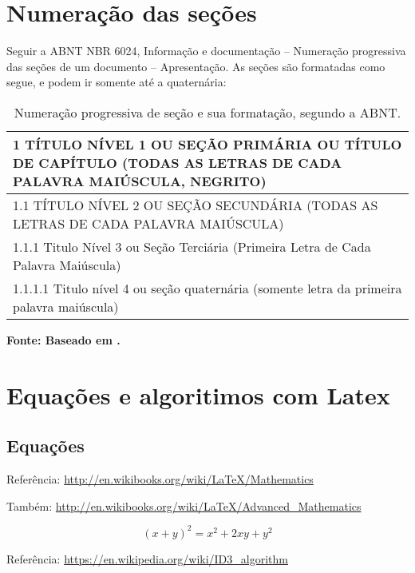 \section{Numeração das seções}\label{sec:NUMERAÇÃO}
Seguir a ABNT NBR 6024, Informação e documentação – Numeração progressiva das seções de um documento – Apresentação. As seções são formatadas como segue, e podem ir somente até a quaternária:

\begin{table}
	\caption{Numeração progressiva de seção e sua formatação, segundo a ABNT.}
	\label{tab:numeracaosecao}
	\begin{tabular}{|p{14.7cm}|} 
		\hline
		\textbf{\large 1 TÍTULO NÍVEL 1 OU SEÇÃO PRIMÁRIA OU TÍTULO DE CAPÍTULO (TODAS AS LETRAS DE CADA PALAVRA MAIÚSCULA, NEGRITO)}  \\ 
		\hline
		1.1 TÍTULO NÍVEL 2 OU SEÇÃO SECUNDÁRIA (TODAS AS LETRAS DE CADA PALAVRA MAIÚSCULA)~ ~                                   \\ 
		\hline
		1.1.1 Titulo Nível 3 ou Seção Terciária (Primeira Letra de Cada Palavra Maiúscula)~ ~                                   \\ 
		\hline
		1.1.1.1 Titulo nível 4 ou seção quaternária (somente letra da primeira palavra maiúscula)~ ~ ~ ~ ~ ~ ~~                 \\
		\hline
	\end{tabular}
	\newline \footnotesize \textbf{Fonte: Baseado em \cite{Nbr2012}.} 
\end{table}

\section{Equações e algoritimos com Latex}\label{sec:LATEX}

\subsection{Equações}\label{sec:Equacoes}
Referência: \url{http://en.wikibooks.org/wiki/LaTeX/Mathematics}

Também: \url{http://en.wikibooks.org/wiki/LaTeX/Advanced_Mathematics}

\begin{equation}
(x + y)^2 = x^2 + 2xy + y^2
\label{eq:Teorema1}
\end{equation}

Referência: \url{https://en.wikipedia.org/wiki/ID3_algorithm}


